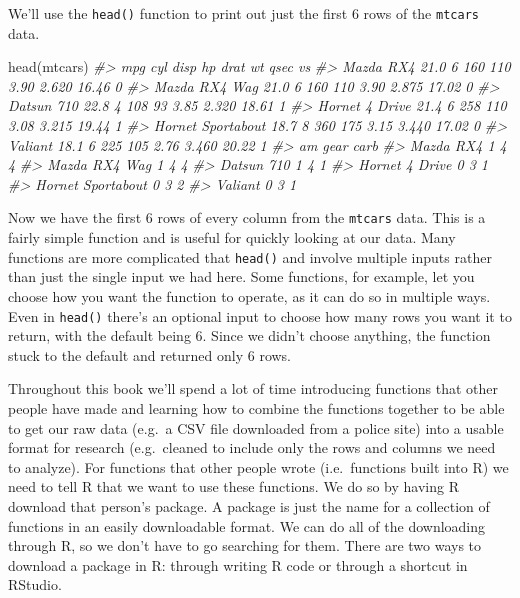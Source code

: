 \documentclass[
]{krantz}
\makeatletter
\newenvironment{Shaded}{\begin{snugshade}}{\end{snugshade}}
\newcommand{\CommentTok}[1]{\textcolor[rgb]{0.37,0.37,0.37}{\textit{#1}}}
\newcommand{\FunctionTok}[1]{\textcolor[rgb]{0,0,0}{#1}}
\newcommand{\NormalTok}[1]{#1}
\newenvironment{kframe}{%
\medskip{}
\setlength{\fboxsep}{.8em}
 \def\at@end@of@kframe{}%
 \ifinner\ifhmode%
  \def\at@end@of@kframe{\end{minipage}}%
  \begin{minipage}{\columnwidth}%
 \fi\fi%
 \def\FrameCommand##1{\hskip\@totalleftmargin \hskip-\fboxsep
 \colorbox{shadecolor}{##1}\hskip-\fboxsep
     \hskip-\linewidth \hskip-\@totalleftmargin \hskip\columnwidth}%
 \MakeFramed {\advance\hsize-\width
   \@totalleftmargin\z@ \linewidth\hsize
   \@setminipage}}%
 {\par\unskip\endMakeFramed%
 \at@end@of@kframe}
\renewenvironment{Shaded}{\begin{kframe}}{\end{kframe}}
\makeatother
\begin{document}
We'll use the \texttt{head()} function to print out just the first 6 rows of the \texttt{mtcars} data.

\begin{Shaded}
\begin{Highlighting}[]
\FunctionTok{head}\NormalTok{(mtcars)}
\CommentTok{\#\textgreater{}                    mpg cyl disp  hp drat    wt  qsec vs}
\CommentTok{\#\textgreater{} Mazda RX4         21.0   6  160 110 3.90 2.620 16.46  0}
\CommentTok{\#\textgreater{} Mazda RX4 Wag     21.0   6  160 110 3.90 2.875 17.02  0}
\CommentTok{\#\textgreater{} Datsun 710        22.8   4  108  93 3.85 2.320 18.61  1}
\CommentTok{\#\textgreater{} Hornet 4 Drive    21.4   6  258 110 3.08 3.215 19.44  1}
\CommentTok{\#\textgreater{} Hornet Sportabout 18.7   8  360 175 3.15 3.440 17.02  0}
\CommentTok{\#\textgreater{} Valiant           18.1   6  225 105 2.76 3.460 20.22  1}
\CommentTok{\#\textgreater{}                   am gear carb}
\CommentTok{\#\textgreater{} Mazda RX4          1    4    4}
\CommentTok{\#\textgreater{} Mazda RX4 Wag      1    4    4}
\CommentTok{\#\textgreater{} Datsun 710         1    4    1}
\CommentTok{\#\textgreater{} Hornet 4 Drive     0    3    1}
\CommentTok{\#\textgreater{} Hornet Sportabout  0    3    2}
\CommentTok{\#\textgreater{} Valiant            0    3    1}
\end{Highlighting}
\end{Shaded}

Now we have the first 6 rows of every column from the \texttt{mtcars} data. This is a fairly simple function and is useful for quickly looking at our data. Many functions are more complicated that \texttt{head()} and involve multiple inputs rather than just the single input we had here. Some functions, for example, let you choose how you want the function to operate, as it can do so in multiple ways. Even in \texttt{head()} there's an optional input to choose how many rows you want it to return, with the default being 6. Since we didn't choose anything, the function stuck to the default and returned only 6 rows.

Throughout this book we'll spend a lot of time introducing functions that other people have made and learning how to combine the functions together to be able to get our raw data (e.g.~a CSV file downloaded from a police site) into a usable format for research (e.g.~cleaned to include only the rows and columns we need to analyze). For functions that other people wrote (i.e.~functions built into R) we need to tell R that we want to use these functions. We do so by having R download that person's package. A package is just the name for a collection of functions in an easily downloadable format. We can do all of the downloading through R, so we don't have to go searching for them. There are two ways to download a package in R: through writing R code or through a shortcut in RStudio.
\end{document}
